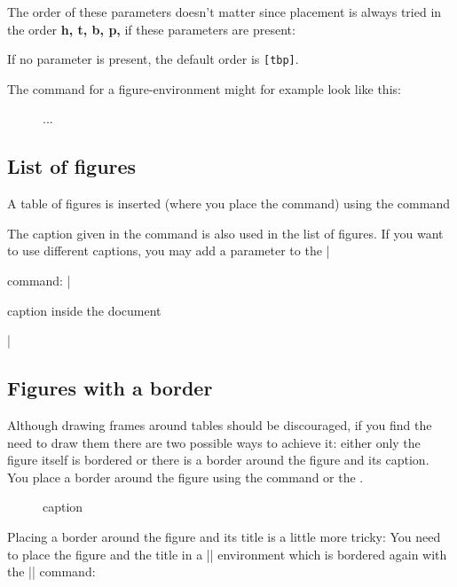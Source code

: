 The order of these parameters doesn't matter since placement is always tried in the order \textbf{h, t, b, p,} if these parameters are present:

If no parameter is present, the default order is  \texttt{[tbp]}.


The command for a figure-environment might for example look like this:

\begin{teX}
\begin{figure}[htbp]
...
\end{figure}
\end{teX}



\subsection{List of figures}
A table of figures is inserted (where you place the command) using the command


\begin{teX}
   \listoffigures
\end{teX}

The caption given in the  command is also used in the list of figures. 
If you want to use different captions, you may add a parameter to the |\caption| command:
|\caption[caption for listoffigures]{caption inside the document}|


\subsection{Figures with a border}

Although drawing frames around tables should be discouraged, if you find the need
to draw them there are  two possible ways to achieve it: either only the figure itself is bordered or there is a border around the figure and its caption. You place a border around the figure using the \cmd{\fbox} command or the \cmd{\framebox}.

\begin{teX}
\begin{figure}[htbp]
  \centering
  \caption{caption}
  \label{Labelname}
\end{figure}
\end{teX}

Placing a border around the figure and its title is a little more tricky: You need to place the figure and the title in a |\minipage| environment which is bordered again with the |\fbox| command:

